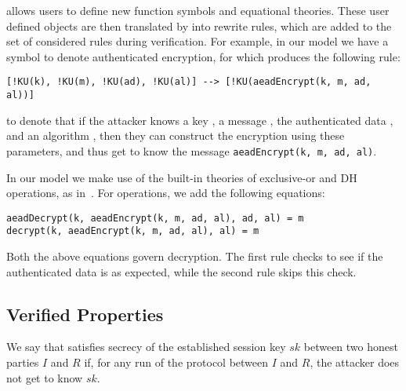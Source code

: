 \mTamarin{} allows users to define new function symbols and equational theories.
These user defined objects are then translated by \mTamarin{} into rewrite
rules, which are added to the set of considered rules during verification.
For example, in our model we have a symbol to denote authenticated encryption, for which \mTamarin{} produces the following rule:
%
\begin{lstlisting}
[!KU(k), !KU(m), !KU(ad), !KU(al)] --> [!KU(aeadEncrypt(k, m, ad, al))]
\end{lstlisting}
%
to denote that if the attacker knows a key , a message , the
authenticated data , and an algorithm , then they can construct
the encryption using these parameters, and thus get to know the message
\lstinline{aeadEncrypt(k, m, ad, al)}.

In our model we make use of
the built-in theories of exclusive-or and DH operations, as in~\cite{DBLP:conf/csfw/DreierHRS18,DBLP:conf/csfw/SchmidtMCB12}.
%
%
For \mAead{} operations, we add the following equations:
\begin{lstlisting}
aeadDecrypt(k, aeadEncrypt(k, m, ad, al), ad, al) = m
decrypt(k, aeadEncrypt(k, m, ad, al), al) = m
\end{lstlisting}
Both the above equations govern decryption. The first rule checks to see if the authenticated data is as expected, while the second rule skips this check.


 
\subsection{Verified Properties}
\label{sec:desired-properties}

 
We say that \mEdhoc{} satisfies secrecy of the established session key $sk$
between two honest parties $I$ and $R$ if, for any run of the protocol between $I$ and
$R$, the attacker does not get to know $sk$.\\
%


